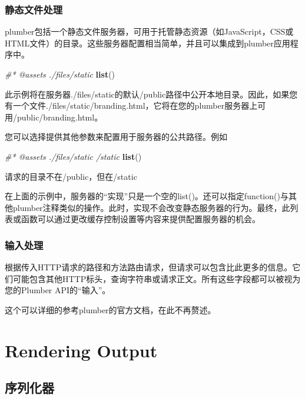 \documentclass[]{book}
\newenvironment{Shaded}{\begin{snugshade}}{\end{snugshade}}
\newcommand{\KeywordTok}[1]{\textcolor[rgb]{0.13,0.29,0.53}{\textbf{#1}}}
\newcommand{\CommentTok}[1]{\textcolor[rgb]{0.56,0.35,0.01}{\textit{#1}}}
\newcommand{\NormalTok}[1]{#1}
\begin{document}
\subsubsection{静态文件处理}

plumber包括一个静态文件服务器，可用于托管静态资源（如JavaScript，CSS或HTML文件）的目录。这些服务器配置相当简单，并且可以集成到plumber应用程序中。

\begin{Shaded}
\begin{Highlighting}[]
\CommentTok{#* @assets ./files/static}
\KeywordTok{list}\NormalTok{()}
\end{Highlighting}
\end{Shaded}

此示例将在服务器./files/static的默认/public路径中公开本地目录。因此，如果您有一个文件./files/static/branding.html，它将在您的plumber服务器上可用/public/branding.html。

您可以选择提供其他参数来配置用于服务器的公共路径。例如

\begin{Shaded}
\begin{Highlighting}[]
\CommentTok{#* @assets ./files/static /static}
\KeywordTok{list}\NormalTok{()}
\end{Highlighting}
\end{Shaded}

请求的目录不在/public，但在/static

在上面的示例中，服务器的``实现''只是一个空的list()。还可以指定function()与其他plumber注释类似的操作。此时，实现不会改变静态服务器的行为。最终，此列表或函数可以通过更改缓存控制设置等内容来提供配置服务器的机会。

\subsubsection{输入处理}

根据传入HTTP请求的路径和方法路由请求，但请求可以包含比此更多的信息。它们可能包含其他HTTP标头，查询字符串或请求正文。所有这些字段都可以被视为您的Plumber
API的``输入''。

这个可以详细的参考plumber的官方文档，在此不再赘述。

\section{Rendering Output}\label{rendering-output}

\subsection{序列化器}
\end{document}
